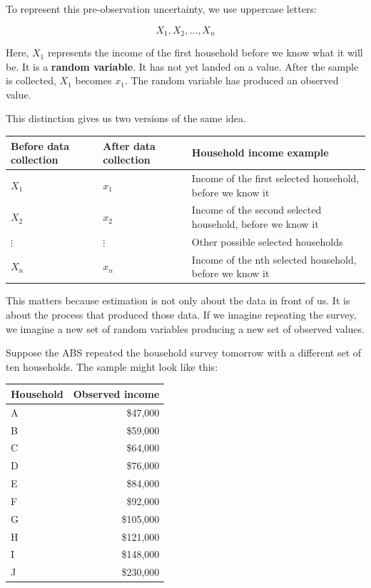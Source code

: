 \documentclass[
  letterpaper,
  DIV=11,
  numbers=noendperiod]{scrreprt}
\begin{document}
To represent this pre-observation uncertainty, we use uppercase letters:

\[
X_1, X_2, \ldots, X_n
\]

Here, \(X_1\) represents the income of the first household before we
know what it will be. It is a \textbf{random variable}. It has not yet
landed on a value. After the sample is collected, \(X_1\) becomes
\(x_1\). The random variable has produced an observed value.

This distinction gives us two versions of the same idea.

\begin{table}
\fontsize{12.0pt}{14.0pt}\selectfont
\begin{tabular*}{\linewidth}{@{\extracolsep{\fill}}lll}
\toprule
Before data collection & After data collection & Household income example \\ 
\midrule\addlinespace[2.5pt]
\(X_1\) & \(x_1\) & Income of the first selected household, before we know it \\ 
\(X_2\) & \(x_2\) & Income of the second selected household, before we know it \\ 
\(\vdots\) & \(\vdots\) & Other possible selected households \\ 
\(X_n\) & \(x_n\) & Income of the nth selected household, before we know it \\ 
\bottomrule
\end{tabular*}
\end{table}

This matters because estimation is not only about the data in front of
us. It is about the process that produced those data. If we imagine
repeating the survey, we imagine a new set of random variables producing
a new set of observed values.

Suppose the ABS repeated the household survey tomorrow with a different
set of ten households. The sample might look like this:

\begin{table}
\fontsize{12.0pt}{14.0pt}\selectfont
\begin{tabular*}{\linewidth}{@{\extracolsep{\fill}}lr}
\toprule
Household & Observed income \\ 
\midrule\addlinespace[2.5pt]
A & \$47,000 \\ 
B & \$59,000 \\ 
C & \$64,000 \\ 
D & \$76,000 \\ 
E & \$84,000 \\ 
F & \$92,000 \\ 
G & \$105,000 \\ 
H & \$121,000 \\ 
I & \$148,000 \\ 
J & \$230,000 \\ 
\bottomrule
\end{tabular*}
\end{table}
\end{document}
